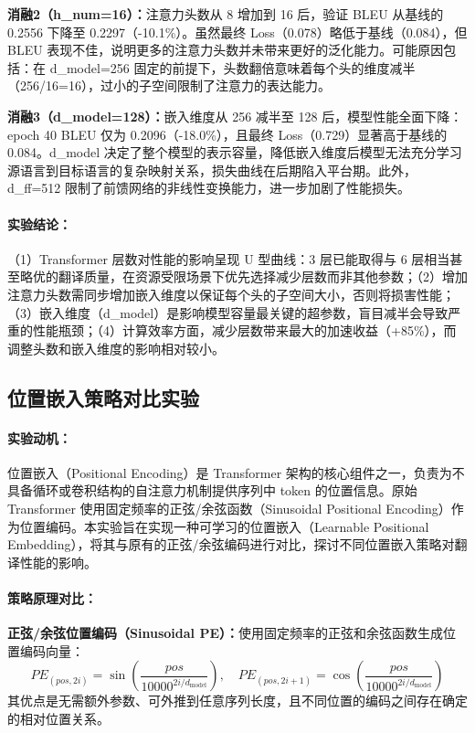 \documentclass[11pt,a4paper]{article}
\begin{document}
\textbf{消融2（h\_num=16）：}注意力头数从 8 增加到 16 后，验证 BLEU 从基线的 0.2556 下降至 0.2297（-10.1\%）。虽然最终 Loss（0.078）略低于基线（0.084），但 BLEU 表现不佳，说明更多的注意力头数并未带来更好的泛化能力。可能原因包括：在 d\_model=256 固定的前提下，头数翻倍意味着每个头的维度减半（256/16=16），过小的子空间限制了注意力的表达能力。

\textbf{消融3（d\_model=128）：}嵌入维度从 256 减半至 128 后，模型性能全面下降：epoch 40 BLEU 仅为 0.2096（-18.0\%），且最终 Loss（0.729）显著高于基线的 0.084。d\_model 决定了整个模型的表示容量，降低嵌入维度后模型无法充分学习源语言到目标语言的复杂映射关系，损失曲线在后期陷入平台期。此外，d\_ff=512 限制了前馈网络的非线性变换能力，进一步加剧了性能损失。

\paragraph{实验结论：}
（1）Transformer 层数对性能的影响呈现 U 型曲线：3 层已能取得与 6 层相当甚至略优的翻译质量，在资源受限场景下优先选择减少层数而非其他参数；（2）增加注意力头数需同步增加嵌入维度以保证每个头的子空间大小，否则将损害性能；（3）嵌入维度（d\_model）是影响模型容量最关键的超参数，盲目减半会导致严重的性能瓶颈；（4）计算效率方面，减少层数带来最大的加速收益（+85\%），而调整头数和嵌入维度的影响相对较小。

\subsection{位置嵌入策略对比实验}

\paragraph{实验动机：}
位置嵌入（Positional Encoding）是 Transformer 架构的核心组件之一，负责为不具备循环或卷积结构的自注意力机制提供序列中 token 的位置信息。原始 Transformer 使用固定频率的正弦/余弦函数（Sinusoidal Positional Encoding）作为位置编码。本实验旨在实现一种可学习的位置嵌入（Learnable Positional Embedding），将其与原有的正弦/余弦编码进行对比，探讨不同位置嵌入策略对翻译性能的影响。

\paragraph{策略原理对比：}

\textbf{正弦/余弦位置编码（Sinusoidal PE）：}使用固定频率的正弦和余弦函数生成位置编码向量：
\[
PE_{(pos,2i)} = \sin\left(\frac{pos}{10000^{2i/d_{\text{model}}}}\right), \quad
PE_{(pos,2i+1)} = \cos\left(\frac{pos}{10000^{2i/d_{\text{model}}}}\right)
\]
其优点是无需额外参数、可外推到任意序列长度，且不同位置的编码之间存在确定的相对位置关系。
\end{document}
